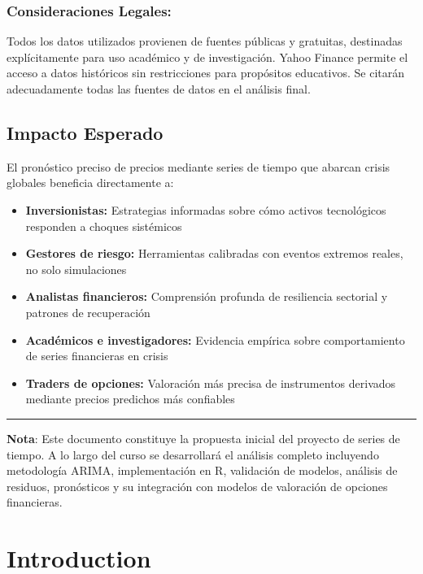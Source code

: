 \documentclass[
]{book}
\providecommand{\tightlist}{%
  \setlength{\itemsep}{0pt}\setlength{\parskip}{0pt}}
\begin{document}
\subsection{Consideraciones Legales:}\label{consideraciones-legales}

Todos los datos utilizados provienen de fuentes públicas y gratuitas, destinadas explícitamente para uso académico y de investigación. Yahoo Finance permite el acceso a datos históricos sin restricciones para propósitos educativos. Se citarán adecuadamente todas las fuentes de datos en el análisis final.

\section{Impacto Esperado}\label{impacto-esperado}

El pronóstico preciso de precios mediante series de tiempo que abarcan crisis globales beneficia directamente a:

\begin{itemize}
\tightlist
\item
  \textbf{Inversionistas:} Estrategias informadas sobre cómo activos tecnológicos responden a choques sistémicos
\item
  \textbf{Gestores de riesgo:} Herramientas calibradas con eventos extremos reales, no solo simulaciones
\item
  \textbf{Analistas financieros:} Comprensión profunda de resiliencia sectorial y patrones de recuperación
\item
  \textbf{Académicos e investigadores:} Evidencia empírica sobre comportamiento de series financieras en crisis
\item
  \textbf{Traders de opciones:} Valoración más precisa de instrumentos derivados mediante precios predichos más confiables
\end{itemize}

\begin{center}\rule{0.5\linewidth}{0.5pt}\end{center}

\textbf{Nota}: Este documento constituye la propuesta inicial del proyecto de series de tiempo. A lo largo del curso se desarrollará el análisis completo incluyendo metodología ARIMA, implementación en R, validación de modelos, análisis de residuos, pronósticos y su integración con modelos de valoración de opciones financieras.

\chapter{Introduction}\label{intro}
\end{document}
